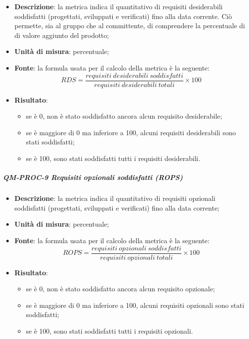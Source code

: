 			\begin{itemize}
				\item \textbf{Descrizione}: la metrica indica il quantitativo di requisiti desiderabili soddisfatti (progettati, sviluppati e verificati) fino alla data corrente. Ciò permette, sia al gruppo che al committente, di comprendere la percentuale di di valore aggiunto del prodotto;
				\item \textbf{Unità di misura}: percentuale;
				\item \textbf{Fonte}: la formula usata per il calcolo della metrica è la seguente:
				\[
				RDS = \frac{requisiti\ desiderabili\ soddisfatti}{requisiti\ desiderabili\ totali} \times 100
				\]
				\item \textbf{Risultato}:
				\begin{itemize}
					\item se è 0, non è stato soddisfatto ancora alcun requisito desiderabile;
					\item se è maggiore di 0 ma inferiore a 100, alcuni requisiti desiderabili sono stati soddisfatti;
					\item se è 100, sono stati soddisfatti tutti i requisiti desiderabili.
				\end{itemize}
			\end{itemize}
			\subparagraph{QM-PROC-9 Requisiti opzionali soddisfatti (ROPS)}
			\begin{itemize}
				\item \textbf{Descrizione}: la metrica indica il quantitativo di requisiti opzionali soddisfatti (progettati, sviluppati e verificati) fino alla data corrente;
				\item \textbf{Unità di misura}: percentuale;
				\item \textbf{Fonte}: la formula usata per il calcolo della metrica è la seguente:
				\[
				ROPS = \frac{requisiti\ opzionali\ soddisfatti}{requisiti\ opzionali\ totali} \times 100
				\]
				\item \textbf{Risultato}:
				\begin{itemize}
					\item se è 0, non è stato soddisfatto ancora alcun requisito opzionale;
					\item se è maggiore di 0 ma inferiore a 100, alcuni requisiti opzionali sono stati soddisfatti;
					\item se è 100, sono stati soddisfatti tutti i requisiti opzionali.
				\end{itemize}
			\end{itemize}